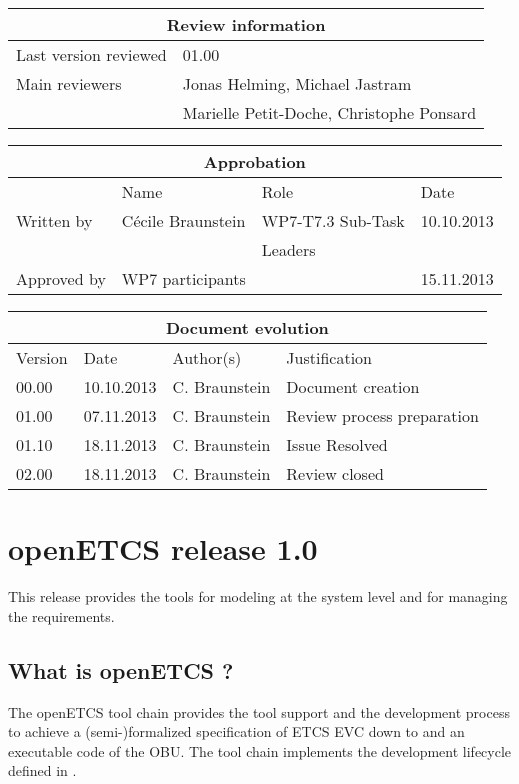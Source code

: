 \documentclass{template/openetcs_report}
\begin{document}
\begin{tabular}{|p{4.4cm}|p{8.7cm}|}
\hline
\multicolumn{2}{|c|}{Review information} \\
\hline
Last version reviewed & 01.00 \\
\hline
Main reviewers & Jonas Helming, Michael Jastram \\
& Marielle Petit-Doche, Christophe Ponsard \\
\hline
\end{tabular}

\begin{tabular}{|p{2.2cm}|p{4cm}|p{4cm}|p{2cm}|}
\hline
\multicolumn{4}{|c|}{Approbation} \\
\hline
  &  Name & Role & Date   \\
\hline  
Written by    &  Cécile Braunstein & WP7-T7.3 Sub-Task  & 10.10.2013 \\
&  & Leaders&\\
\hline
Approved by & WP7 participants &   & 15.11.2013 \\
\hline
\end{tabular}

\begin{tabular}{|p{2.2cm}|p{2cm}|p{3cm}|p{5cm}|}
\hline
\multicolumn{4}{|c|}{Document evolution} \\
\hline
Version &  Date & Author(s) & Justification  \\
\hline  
00.00 & 10.10.2013 & C. Braunstein  &  Document creation  \\
01.00 & 07.11.2013 & C. Braunstein  &  Review process preparation \\
01.10 & 18.11.2013 & C. Braunstein  &  Issue Resolved \\
02.00 & 18.11.2013 & C. Braunstein  &  Review closed \\


\hline  
\end{tabular}
\newpage


\mainmatter
\chapter{openETCS release 1.0}

This release provides the tools for modeling at the system level and
for managing the requirements.

\section{What is openETCS ?}
The openETCS tool chain provides the tool support and the development process to achieve a (semi-)formalized
specification of ETCS EVC down to and an executable code of the
OBU. The tool chain implements the development lifecycle defined in \cite{D2.3}.
\end{document}
